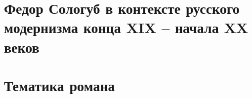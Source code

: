 \documentclass[12pt,a4paper]{article}
\begin{document}

\section{Федор Сологуб в контексте русского модернизма конца XIX -- начала XX веков}






\section{Тематика романа}
\end{document}
